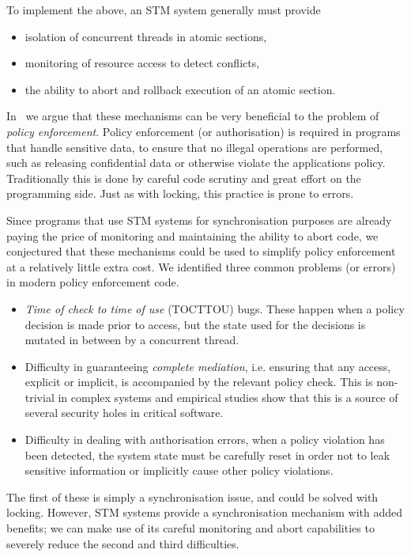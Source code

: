 To implement the above, an STM system generally must provide
\begin{itemize}
    \item isolation of concurrent threads in atomic sections,
    \item monitoring of resource access to detect conflicts,
    \item the ability to abort and rollback execution of an atomic section.
\end{itemize}
In~\cite{tmi} we argue that these mechanisms can be very beneficial to the problem
of \emph{policy enforcement}. Policy enforcement (or authorisation) is required
in programs that handle sensitive data, to ensure that no illegal operations are
performed, such as releasing confidential data or otherwise violate the applications
policy. Traditionally this is done by careful code scrutiny and great effort on
the programming side. Just as with locking, this practice is prone to errors.

Since programs that use STM systems for synchronisation purposes are already paying
the price of monitoring and maintaining the ability to abort code, we conjectured
that these mechanisms could be used to simplify policy enforcement at a relatively
little extra cost. We identified three common problems (or errors) in modern policy
enforcement code.
\begin{itemize}
    \item \emph{Time of check to time of use} (TOCTTOU) bugs. These happen when
    a policy decision is made prior to access, but the state used for the decisions
    is mutated in between by a concurrent thread.
    \item Difficulty in guaranteeing \emph{complete mediation}, i.e. ensuring that
    any access, explicit or implicit, is accompanied by the relevant policy check.
    This is non-trivial in complex systems and empirical studies show that this
    is a source of several security holes in critical software.
    \item Difficulty in dealing with authorisation errors, when a policy violation
    has been detected, the system state must be carefully reset in order not to leak
    sensitive information or implicitly cause other policy violations.
\end{itemize}
The first of these is simply a synchronisation issue, and could be solved with locking.
However, STM systems provide a synchronisation mechanism with added benefits; we
can make use of its careful monitoring and abort capabilities to severely reduce
the second and third difficulties.

